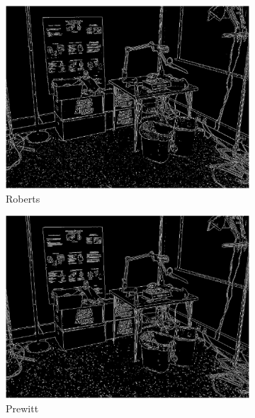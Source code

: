 \documentclass[lettersize,journal]{IEEEtran}
\begin{document}
\begin{figure}[h]
    \centering 
     
    \begin{subfigure}[h]{0.21\textwidth}
        \centering 
        \includegraphics[width=\linewidth]{edge_map_roberts_0.03}
        \caption{Roberts}  
    \end{subfigure}
    \begin{subfigure}[h]{0.21\textwidth}
        \centering
        \includegraphics[width=\linewidth]{edge_map_prewitt_0.025}
        \caption{Prewitt}  
    \end{subfigure}
    \begin{subfigure}[h]{0.21\textwidth}

\end{subfigure}
\end{figure}
\end{document}

